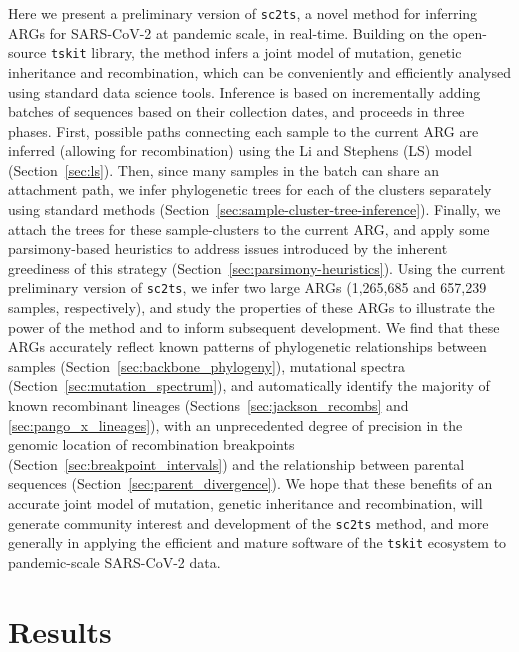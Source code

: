 \documentclass{article}
\begin{document}
Here we present a preliminary version of \texttt{sc2ts}, a novel method
for inferring ARGs for SARS-CoV-2 at pandemic scale, in real-time.
Building on the open-source \texttt{tskit} library, the method infers
a joint model of mutation, genetic inheritance and recombination, which
can be conveniently and efficiently analysed using standard data science
tools. Inference is based on incrementally adding batches of sequences
based on their collection dates, and proceeds in three phases.
First, possible paths connecting each sample to the current ARG
are inferred (allowing for recombination) using the
Li and Stephens (LS) model (Section~\ref{sec:ls}). Then, since many samples
in the batch can share an attachment path,
we infer phylogenetic trees for each of the clusters separately using standard
methods (Section~\ref{sec:sample-cluster-tree-inference}).
Finally, we attach the trees for these sample-clusters to the current
ARG, and apply some parsimony-based heuristics to address issues
introduced by the inherent greediness of this strategy
(Section~\ref{sec:parsimony-heuristics}).
Using the current preliminary version of \texttt{sc2ts}, we infer two
large ARGs (1,265,685 and 657,239 samples, respectively), and study
the properties of these ARGs to illustrate the power of the method
and to inform subsequent development. We find that these
ARGs accurately reflect known patterns of phylogenetic relationships
between samples (Section~\ref{sec:backbone_phylogeny}),
mutational spectra (Section~\ref{sec:mutation_spectrum}),
and automatically identify the majority of known recombinant
lineages (Sections~\ref{sec:jackson_recombs} and \ref{sec:pango_x_lineages}),
with an unprecedented degree of precision in the
genomic location of recombination breakpoints
(Section~\ref{sec:breakpoint_intervals})
and the relationship between parental sequences
(Section~\ref{sec:parent_divergence}).
We hope that these benefits of an accurate joint model of
mutation, genetic inheritance and recombination, will generate community
interest and development of the \texttt{sc2ts} method, and
more generally in applying the efficient and mature software
of the \texttt{tskit} ecosystem to pandemic-scale SARS-CoV-2 data.

\section{Results}
\end{document}
